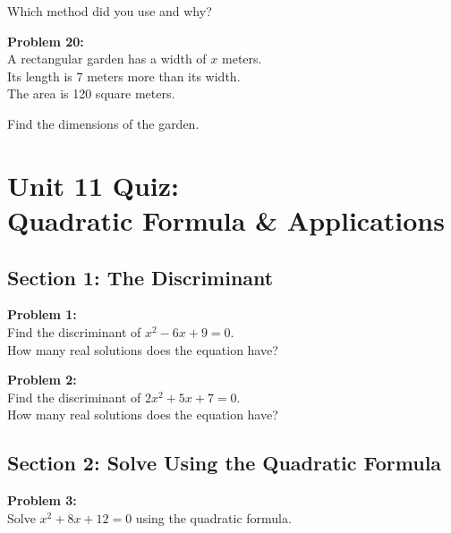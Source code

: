 \documentclass[12pt]{article}
\begin{document}
			Which method did you use and why?

			\newpage

			\textbf{Problem 20:}\\

			A rectangular garden has a width of $x$ meters.\\

			Its length is 7 meters more than its width.\\

			The area is 120 square meters.

			\vspace{0.5cm}

			Find the dimensions of the garden.

			\newpage

	\section*{Unit 11 Quiz: \\ Quadratic Formula \& Applications}

		\subsection*{Section 1: The Discriminant}

			\textbf{Problem 1:}\\

			Find the discriminant of $x^2 - 6x + 9 = 0$.\\

			How many real solutions does the equation have?

			\vspace{4cm}

			\textbf{Problem 2:}\\

			Find the discriminant of $2x^2 + 5x + 7 = 0$.\\

			How many real solutions does the equation have?

			\newpage

		\subsection*{Section 2: Solve Using the Quadratic Formula}

			\textbf{Problem 3:}\\

			Solve $x^2 + 8x + 12 = 0$ using the quadratic formula.
\end{document}
